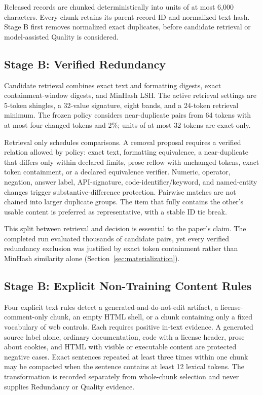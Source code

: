 \documentclass[conference]{IEEEtran}
\begin{document}
Released records are chunked deterministically into units of at most 6,000 characters.
Every chunk retains its parent record ID and normalized text hash. Stage B
first removes normalized exact duplicates, before candidate retrieval or
model-assisted Quality is considered.

\subsection{Stage B: Verified Redundancy}
Candidate retrieval combines exact text and formatting digests, exact
containment-window digests, and MinHash LSH. The active retrieval settings are
5-token shingles, a 32-value signature, eight bands, and a 24-token retrieval
minimum. The frozen policy considers near-duplicate pairs from 64 tokens with
at most four changed tokens and 2\%; units of at most 32 tokens are exact-only.

Retrieval only schedules comparisons. A removal proposal requires a verified
relation allowed by policy: exact text, formatting equivalence, a near-duplicate
that differs only within declared limits, prose reflow with unchanged tokens,
exact token containment, or a declared equivalence verifier. Numeric, operator,
negation, answer
label, API-signature, code-identifier/keyword, and named-entity changes trigger
substantive-difference protection. Pairwise matches are not chained into larger
duplicate groups. The item that fully contains the other's usable content is
preferred as representative, with a
stable ID tie break.

This split between retrieval and decision is essential to the paper's claim.
The completed run evaluated thousands of candidate pairs, yet every verified
redundancy exclusion was justified by exact token containment rather than
MinHash similarity alone (Section~\ref{sec:materialization}).

\subsection{Stage B: Explicit Non-Training Content Rules}
Four explicit text rules detect a generated-and-do-not-edit artifact,
a license-comment-only chunk, an empty HTML shell, or a chunk containing only
a fixed vocabulary of web controls. Each requires positive in-text evidence.
A generated source label alone, ordinary documentation, code with a license
header, prose about cookies, and HTML with visible or executable content are
protected negative cases. Exact sentences repeated at least three times within
one chunk may be compacted when the sentence contains at least 12 lexical
tokens. The transformation is recorded separately from whole-chunk selection
and never supplies Redundancy or Quality evidence.
\end{document}
